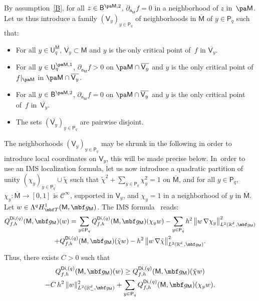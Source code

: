 By assumption~\ref{B}, for all $z\in \mathsf B^{\pa \mathsf M,2}$,
$ \partial_{\mathsf n_{\mathsf M}}f=0$ in a neighborhood of $z$
in~$\pa \mathsf M$. Let us thus introduce a family $(\mathsf
V_y)_{y\in \mathsf P_q}$ of neighborhoods in
$\overline{\mathsf M}$ of $y\in \mathsf P_q$ such that:
\begin{itemize}
\item
For all $y\in \mathsf U^{\mathsf M}_q$, $\overline{\mathsf V_y}\subset \mathsf M$ and $y$ is the only critical point of~$f$ in $\overline{\mathsf V_y}$.
\item
For all $y\in \mathsf U^{\pa \mathsf M,1}_q$, $
\partial_{\mathsf n_{\mathsf M}}f>0$ on $\pa \mathsf M \cap
\overline{\mathsf V_y}$ and $y$ is the only critical point of $f|_{\pa \mathsf M}$ in $\pa \mathsf M \cap \overline{\mathsf V_y}$.
\item
For all $y\in \mathsf B^{\pa \mathsf M,2}$, $ \partial_{\mathsf n_{\mathsf M}}f=0$ on $\pa \mathsf M \cap\overline {\mathsf V_y}$
and $y$ is the only critical point of~$f$ in~$\overline {\mathsf V_y}$.
\item
The sets $(\overline{\mathsf V_y})_{y\in \mathsf P_q}$ are pairwise disjoint.
\end{itemize}
The neighborhoods $(\mathsf V_y)_{y\in \mathsf P_q}$ may be shrunk in the
following in order to introduce local coordinates on $\mathsf V_y$, this will be made precise below. In~order to use an IMS localization formula, let us now introduce a
quadratic partition of unity $(\chi_y)_{y\in \mathsf P_q}\cup \tilde
\chi$ such that $\tilde \chi^2 + \sum_{y\in \mathsf P_q} \chi_y^2 =
1$ on $\overline{\mathsf M}$, and for all $y\in \mathsf P_q$, $\chi_y: \overline{\mathsf M}\to
[0,1]$ is $\mathcal C^\infty$, supported in $\mathsf V_y$, and
$\chi_y=1$ in a neighborhood of $y$ in $\overline{\mathsf M} $.
Let $w\in \Lambda^qH^1_{\mbf T}(\mathsf M,\mbf g_{\mathsf M})$.
The IMS formula~\cite{CFKS,helffer-nier-06} reads:\vspace*{-3pt}
\begin{multline*}
Q_{f,h}^{\mathsf{Di},(q)}(\mathsf M,\mbf g_{\mathsf M})(w) =\sum_{y\in \mathsf P_q} Q_{f,h}^{\mathsf{Di},(q)}(\mathsf M,\mbf g_{\mathsf M})(\chi_y w) -\sum_{y\in \mathsf P_q} h^2\,\big \Vert w\, \nabla \chi_y \big \Vert_{L^2(\mathbb R_-^d,\mbf g_{\mathsf M})}^2\\
+ Q_{f,h}^{\mathsf{Di},(q)}(\mathsf M,\mbf g_{\mathsf M})(\tilde \chi w) - h^2\,\big \Vert w\, \nabla \tilde \chi \big \Vert_{L^2(\mathbb R_-^d,\mbf g_{\mathsf M})}^2.
\end{multline*}
Thus, there exists $C>0$ such that\vspace*{-3pt}
\begin{multline}
\label{eq.IMSfin}
Q_{f,h}^{\mathsf{Di},(q)}(\mathsf M,\mbf g_{\mathsf M})(w) \ge
Q_{f,h}^{\mathsf{Di},(q)}(\mathsf M,\mbf g_{\mathsf M})(\tilde \chi
w)\\
-C\, h^2\, \Vert w \Vert_{L^2(\mathbb R_-^d,\mbf g_{\mathsf
M})}^2
+\sum_{y\in \mathsf P_q} Q_{f,h}^{\mathsf{Di},(q)}(\mathsf M,\mbf g_{\mathsf M})(\chi_y w).
\end{multline}

